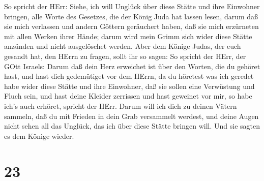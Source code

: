  So spricht der HErr: Siehe, ich will Unglück über diese
Stätte und ihre Einwohner bringen, alle Worte des Gesetzes, die der
König Juda hat lassen lesen,  darum daß sie mich verlassen
und andern Göttern geräuchert haben, daß sie mich erzürneten mit allen
Werken ihrer Hände; darum wird mein Grimm sich wider diese Stätte
anzünden und nicht ausgelöschet werden.  Aber dem Könige
Judas, der euch gesandt hat, den HErrn zu fragen, sollt ihr so sagen: So
spricht der HErr, der GOtt Israels:  Darum daß dein Herz
erweichet ist über den Worten, die du gehöret hast, und hast dich
gedemütiget vor dem HErrn, da du höretest was ich geredet habe wider
diese Stätte und ihre Einwohner, daß sie sollen eine Verwüstung und
Fluch sein, und hast deine Kleider zerrissen und hast geweinet vor mir,
so habe ich's auch erhöret, spricht der HErr.  Darum will
ich dich zu deinen Vätern sammeln, daß du mit Frieden in dein Grab
versammelt werdest, und deine Augen nicht sehen all das Unglück, das ich
über diese Stätte bringen will. Und sie sagten es dem Könige wieder.

\hypertarget{section-22}{%
\section{23}\label{section-22}}

